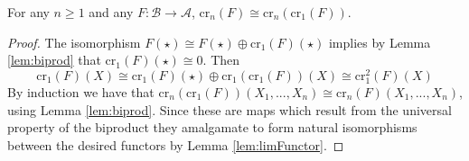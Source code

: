 \begin{lem}[label=lem:idempotCr1]
    For any $n \geq 1$ and any $F:\mathcal{B}\rightarrow \mathcal{A}$, $\text{cr}_n(F)\cong \text{cr}_n(\text{cr}_1(F))$.
\end{lem}
\begin{proof}
    The isomorphism $F(\star) \cong F(\star)\oplus \text{cr}_1(F)(\star)$ implies by Lemma \ref{lem:biprod} that $\text{cr}_1(F)(\star)\cong 0$. Then 
    \begin{equation*}
        \text{cr}_1(F)(X) \cong \text{cr}_1(F)(\star)\oplus \text{cr}_1(\text{cr}_1(F))(X) \cong \text{cr}_1^2(F)(X)
    \end{equation*}
    By induction we have that $\text{cr}_n(\text{cr}_1(F))(X_1,...,X_n) \cong \text{cr}_n(F)(X_1,...,X_n)$, using Lemma \ref{lem:biprod}. Since these are maps which result from the universal property of the biproduct they amalgamate to form natural isomorphisms between the desired functors by Lemma \ref{lem:limFunctor}.
\end{proof}

